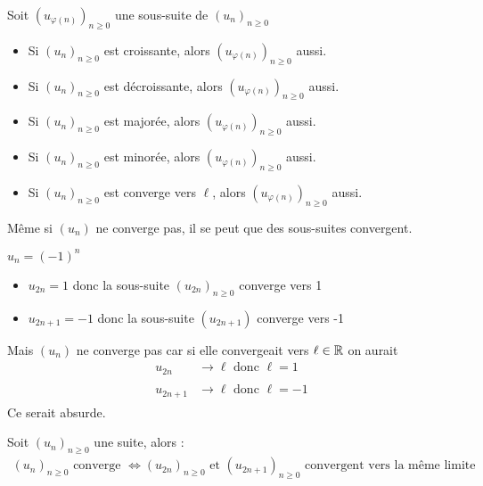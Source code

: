 \begin{graybox}
    \begin{proposition}[Propriétés]
    Soit $(u_{\varphi(n)})_{n \geq 0}$ une sous-suite de $(u_n)_{n \geq 0}$
    \begin{itemize}
        \item Si $(u_n)_{n \geq 0}$ est croissante, alors $(u_{\varphi(n)})_{n \geq 0}$ aussi.
        \item Si $(u_n)_{n \geq 0}$ est décroissante, alors $(u_{\varphi(n)})_{n \geq 0}$ aussi.
        \item Si $(u_n)_{n \geq 0}$ est majorée, alors $(u_{\varphi(n)})_{n \geq 0}$ aussi.
        \item Si $(u_n)_{n \geq 0}$ est minorée, alors $(u_{\varphi(n)})_{n \geq 0}$ aussi.
        \item Si $(u_n)_{n \geq 0}$ est converge vers $\ell$, alors $(u_{\varphi(n)})_{n \geq 0}$ aussi.
    \end{itemize}
\end{proposition} 
\end{graybox}

\begin{remarque}[Important]
    Même si $(u_n)$ ne converge pas, il se peut que des sous-suites convergent.
\end{remarque}

\begin{exemple}
    $u_n = (-1)^n$
    \begin{itemize}
        \item $u_{2n} = 1$ donc la sous-suite $(u_{2n})_{n \geq 0}$ converge vers 1
        \item $u_{2n+1} = -1$ donc la sous-suite $(u_{2n+1})$ converge vers -1
    \end{itemize}
    Mais $(u_n)$ ne converge pas car si elle convergeait vers $\ell \in \mathbb{R}$ on aurait
    \begin{align*}
        u_{2n} &\xrightarrow[]{} \ell \text{ donc } \ell = 1 \\
        u_{2n+1} &\xrightarrow[]{} \ell \text{ donc } \ell = -1
    \end{align*}
    Ce serait absurde.
\end{exemple}

\begin{graybox}
    \begin{proposition}
    Soit $(u_n)_{n \geq 0}$ une suite, alors :
    \begin{align*}
        (u_n)_{n \geq 0} \text{ converge } \iff (u_{2n})_{n \geq 0} \text{ et } (u_{2n+1})_{n \geq 0} \text{ convergent vers la même limite}
    \end{align*}
\end{proposition}
\end{graybox}

